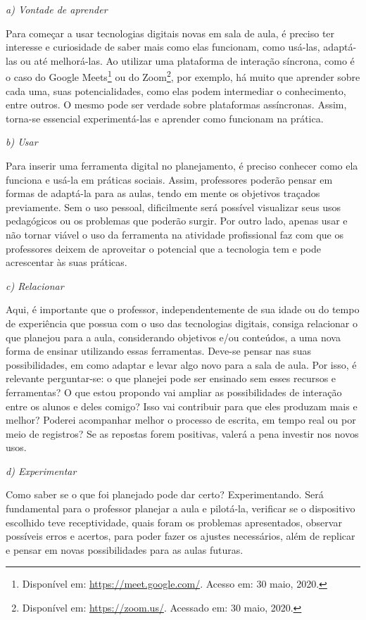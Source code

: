 \documentclass{textolivre}
\begin{document}
\textit{a) Vontade de aprender}

Para começar a usar tecnologias digitais novas em sala de aula, é preciso ter interesse e curiosidade de saber mais como elas funcionam, como usá-las, adaptá-las ou até melhorá-las. Ao utilizar uma plataforma de interação síncrona, como é o caso do Google Meets\footnote{Disponível em: \url{https://meet.google.com/}. Acesso em: 30 maio, 2020.} ou do Zoom\footnote{Disponível em: \url{https://zoom.us/}. Acessado em: 30 maio, 2020.}, por exemplo, há muito que aprender sobre cada uma, suas potencialidades, como elas podem intermediar o conhecimento, entre outros. O mesmo pode ser verdade sobre plataformas assíncronas. Assim, torna-se essencial experimentá-las e aprender como funcionam na prática.

\textit{b) Usar}

Para inserir uma ferramenta digital no planejamento, é preciso conhecer como ela funciona e usá-la em práticas sociais. Assim, professores poderão pensar em formas de adaptá-la para as aulas, tendo em mente os objetivos traçados previamente. Sem o uso pessoal, dificilmente será possível visualizar seus usos pedagógicos ou os problemas que poderão surgir. Por outro lado, apenas usar e não tornar viável o uso da ferramenta na atividade profissional faz com que os professores deixem de aproveitar o potencial que a tecnologia tem e pode acrescentar às suas práticas.

\textit{c) Relacionar}

Aqui, é importante que o professor, independentemente de sua idade ou do tempo de experiência que possua com o uso das tecnologias digitais, consiga relacionar o que planejou para a aula, considerando objetivos e/ou conteúdos, a uma nova forma de ensinar utilizando essas ferramentas. Deve-se pensar nas suas possibilidades, em como adaptar e levar algo novo para a sala de aula. Por isso, é relevante perguntar-se: o que planejei pode ser ensinado sem esses recursos e ferramentas? O que estou propondo vai ampliar as possibilidades de interação entre os alunos e deles comigo? Isso vai contribuir para que eles produzam mais e melhor? Poderei acompanhar melhor o processo de escrita, em tempo real ou por meio de registros? Se as repostas forem positivas, valerá a pena investir nos novos usos. 

\textit{d) Experimentar} 

Como saber se o que foi planejado pode dar certo? Experimentando. Será fundamental para o professor planejar a aula e pilotá-la, verificar se o dispositivo escolhido teve receptividade, quais foram os problemas apresentados, observar possíveis erros e acertos, para poder fazer os ajustes necessários, além de replicar e pensar em novas possibilidades para as aulas futuras.
\end{document}
